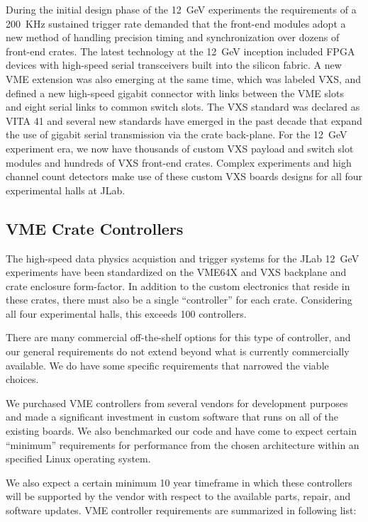 During the initial design phase of the 12~GeV experiments the requirements of a 200~KHz sustained trigger rate demanded that the front-end modules adopt a new method of handling precision timing and synchronization over dozens of front-end crates. The latest technology at the 12~GeV inception included FPGA devices with high-speed serial transceivers built into the silicon fabric. A new VME extension was also emerging at the same time, which was labeled VXS, and defined a new high-speed gigabit connector with links between the VME slots and eight serial links to common switch slots. The VXS standard was declared as VITA 41 and several new standards have emerged in the past decade that expand the use of gigabit serial transmission via the crate back-plane. For the 12~GeV experiment era, we now have thousands of custom VXS payload and switch slot modules and hundreds of VXS front-end crates. Complex experiments and high channel count detectors make use of these custom VXS boards  designs for all four experimental halls at JLab.

\subsection{VME Crate Controllers}

The high-speed data physics acquistion and trigger systems for the JLab 12~GeV experiments have been standardized on the VME64X and VXS backplane and crate enclosure form-factor. In addition to the custom electronics that reside in these crates, there must also be a single ``controller'' for each crate. Considering all four experimental halls, this exceeds 100 controllers.

There are many commercial off-the-shelf options for this type of controller, and our general requirements do not extend beyond what is currently commercially available. We do have some specific requirements that narrowed the viable choices.

We purchased VME controllers from several vendors for development purposes and made a significant investment in custom software that runs on all of the existing boards. We also benchmarked our code and have come to expect certain ``minimum'' requirements for performance from the chosen architecture within an specified Linux operating system.

We also expect a certain minimum 10 year timeframe in which these controllers will be supported by the vendor with respect to the available parts, repair, and software updates. VME controller requirements are summarized in following list:

